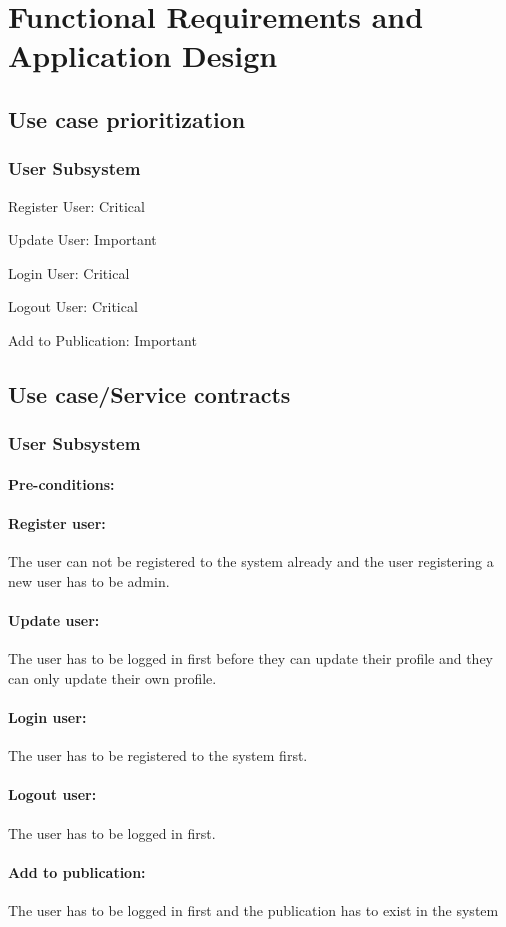 \documentclass{article}
\begin{document}
	\section{Functional Requirements and Application Design}
	\subsection{Use case prioritization}
	\subsubsection{User Subsystem}
	Register User: Critical\par
	Update User: Important\par
	Login User: Critical\par
	Logout User: Critical\par
	Add to Publication: Important
	\subsection{Use case/Service contracts}
	\subsubsection{User Subsystem}
	\paragraph{Pre-conditions:}
	\paragraph{Register user:} The user can not be registered to the system already and the user registering a new user has to be admin.
	\paragraph{Update user:} The user has to be logged in first before they can update their profile and they can only update their own profile.
	\paragraph{Login user:} The user has to be registered to the system first.
	\paragraph{Logout user:} The user has to be logged in first.
	\paragraph{Add to publication:} The user has to be logged in first and the publication has to exist in the system
\end{document}

